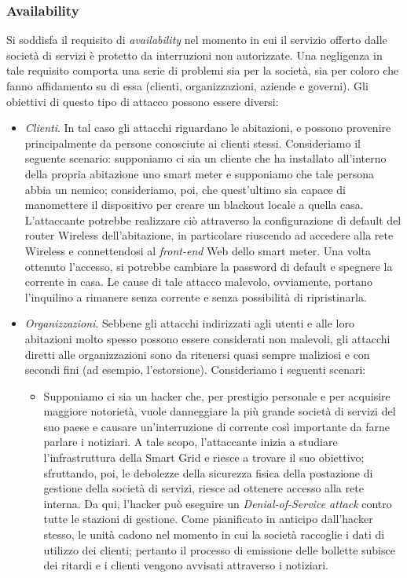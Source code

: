 \subsubsection{Availability}
Si soddisfa il requisito di \textit{availability} nel momento in cui il servizio offerto dalle società di servizi è protetto da interruzioni non autorizzate. Una negligenza in tale requisito comporta una serie di problemi sia per la società, sia per coloro che fanno affidamento su di essa (clienti, organizzazioni, aziende e governi). Gli obiettivi di questo tipo di attacco possono essere diversi:
\begin{itemize}
\item \textit{Clienti}. In tal caso gli attacchi riguardano le abitazioni, e possono provenire principalmente da persone conosciute ai clienti stessi. Consideriamo il seguente scenario: supponiamo ci sia un cliente che ha installato all'interno della propria abitazione uno smart meter e supponiamo che tale persona abbia un nemico; consideriamo, poi, che quest'ultimo sia capace di manomettere il dispositivo per creare un blackout locale a quella casa. L'attaccante potrebbe realizzare ciò attraverso la configurazione di default del router Wireless dell'abitazione, in particolare riuscendo ad accedere alla rete Wireless e connettendosi al \textit{front-end} Web dello smart meter. Una volta ottenuto l'accesso, si potrebbe cambiare la password di default e spegnere la corrente in casa. Le cause di tale attacco malevolo, ovviamente, portano l'inquilino a rimanere senza corrente e senza possibilità di ripristinarla.
\item \textit{Organizzazioni}. Sebbene gli attacchi indirizzati agli utenti e alle loro abitazioni molto spesso possono essere considerati non malevoli, gli attacchi diretti alle organizzazioni sono da ritenersi quasi sempre maliziosi e con secondi fini (ad esempio, l'estorsione). Consideriamo i seguenti scenari:
	\begin{itemize}
	\item Supponiamo ci sia un hacker che, per prestigio personale e per acquisire maggiore notorietà, vuole danneggiare la più grande società di servizi del suo paese e causare un'interruzione di corrente così importante da farne parlare i notiziari. A tale scopo, l'attaccante inizia a studiare l'infrastruttura della Smart Grid e riesce a trovare il suo obiettivo; sfruttando, poi, le debolezze della sicurezza fisica della postazione di gestione della società di servizi, riesce ad ottenere accesso alla rete interna. Da qui, l'hacker può eseguire un \textit{Denial-of-Service attack} contro tutte le stazioni di gestione. Come pianificato in anticipo dall'hacker stesso, le unità cadono nel momento in cui la società raccoglie i dati di utilizzo dei clienti; pertanto il processo di emissione delle bollette subisce dei ritardi e i clienti vengono avvisati attraverso i notiziari.

\end{itemize}
\end{itemize}
